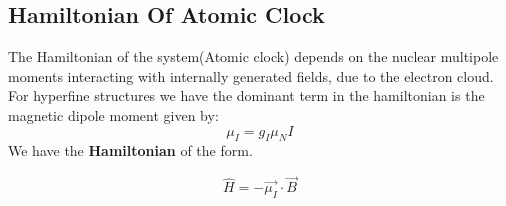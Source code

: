 \documentclass[%
 aapm,
 mph,%
 amsmath,amssymb,
 reprint,%
]{revtex4-2}
\begin{document}
\subsection{Hamiltonian Of Atomic Clock}
The Hamiltonian of the system(Atomic clock) \cite{wikipedia:1108487361} depends on the nuclear multipole moments interacting with internally generated fields, due to the electron cloud. For hyperfine structures we have the dominant term in the hamiltonian is the magnetic dipole moment given by:
\begin{equation}
    \mu_I = g_I\mu_NI
\end{equation}
We have the \textbf{Hamiltonian} of the form.

\begin{equation}
\hat{H} = -\vec{\mu_I}\cdot \Vec{B} 
\end{equation}
\end{document}
